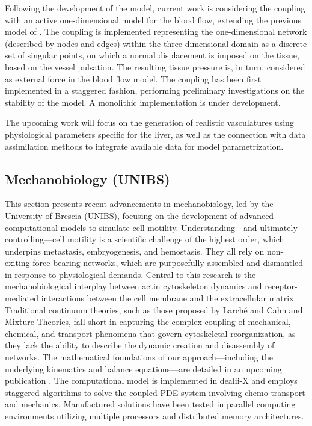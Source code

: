 \documentclass[a4paper,12pt]{article}
\begin{document}
Following the development of the model, current work is considering the coupling with an active one-dimensional model for the blood flow, extending the previous model of \cite{heltai2021multiscale}. The coupling is implemented representing the one-dimensional network (described by nodes and edges) within the three-dimensional domain as a discrete set of singular points, on which a normal displacement is imposed on the tissue, based on the vessel pulsation. The resulting tissue pressure is, in turn, considered as external force in the blood flow model. The coupling has been first implemented in a staggered fashion, performing preliminary investigations on the stability of the model. A monolithic implementation is under development.

The upcoming work will focus on the generation of realistic vasculatures using physiological parameters specific for the liver, as well as the connection with data assimilation methods to integrate available data for model parametrization.

\subsection{Mechanobiology (UNIBS)}

This section presents recent advancements in mechanobiology, led by the University of Brescia (UNIBS), focusing on the development of advanced computational models to simulate cell motility. Understanding—and ultimately controlling—cell motility is a scientific challenge of the highest order, which underpins metastasis, embryogenesis, and hemostasis. They all rely on non-exiting force-bearing networks, which are purposefully assembled and dismantled in response to physiological demands. Central to this research is the mechanobiological interplay between actin cytoskeleton dynamics and receptor-mediated interactions between the cell membrane and the extracellular matrix. Traditional continuum theories, such as those proposed by Larché and Cahn and Mixture Theories, fall short in capturing the complex coupling of mechanical, chemical, and transport phenomena that govern cytoskeletal reorganization, as they lack the ability to describe the dynamic creation and disassembly of networks. The mathematical foundations of our approach—including the underlying kinematics and balance equations—are detailed in an upcoming publication \citep{salvadori2025chemo}. The computational model is implemented in dealii-X and employs staggered algorithms to solve the coupled PDE system involving chemo-transport and mechanics. Manufactured solutions have been tested in parallel computing environments utilizing multiple processors and distributed memory architectures.
\end{document}
